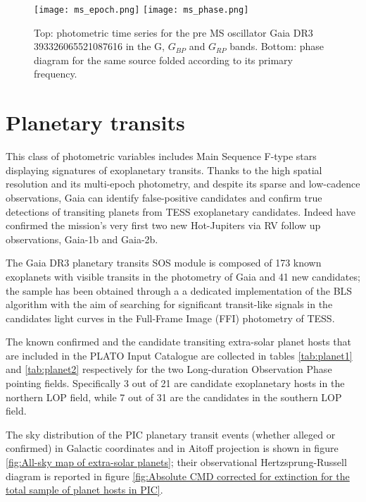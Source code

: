 \begin{figure}[H]
\centering
\texttt{[image: ms\_epoch.png]}
\texttt{[image: ms\_phase.png]}
\caption{Top: photometric time series for the pre MS oscillator Gaia DR3 393326065521087616 in the G, $G_{BP}$ and $G_{RP}$ bands.
Bottom: phase diagram for the same source folded according to its primary frequency.}
\label{fig:ms}
\end{figure}





\newpage

\section{Planetary transits}



This class of photometric variables includes Main Sequence F-type stars displaying signatures of exoplanetary transits. 
Thanks to the high spatial resolution and its multi-epoch photometry, and despite its sparse and low-cadence observations, Gaia can identify false-positive candidates and confirm true detections of transiting planets from TESS exoplanetary candidates.
Indeed \cite{Panahi_2022} have confirmed the mission's very first two new Hot-Jupiters via RV follow up observations, Gaia-1b and Gaia-2b.

The Gaia DR3 planetary transits SOS module is composed of 173 known exoplanets with visible transits in the photometry of Gaia and 41 new candidates; the sample has been obtained through a a dedicated implementation of the BLS algorithm with the aim of searching for significant transit-like signals in the candidates light curves in the Full-Frame Image (FFI) photometry of TESS.

The known confirmed and the candidate transiting extra-solar planet hosts that are included in the PLATO Input Catalogue are collected in tables \ref{tab:planet1} and \ref{tab:planet2} respectively for the two Long-duration Observation Phase pointing fields.
Specifically 3 out of 21 are candidate exoplanetary hosts in the northern LOP field, while 7 out of 31 are the candidates in the southern LOP field.

The sky distribution of the PIC planetary transit events (whether alleged or confirmed) in Galactic coordinates and in Aitoff projection is shown in figure \ref{fig:All-sky map of extra-solar planets}; their observational Hertzsprung-Russell diagram is reported in figure \ref{fig:Absolute CMD corrected for extinction for the total sample of planet hosts in PIC}.



